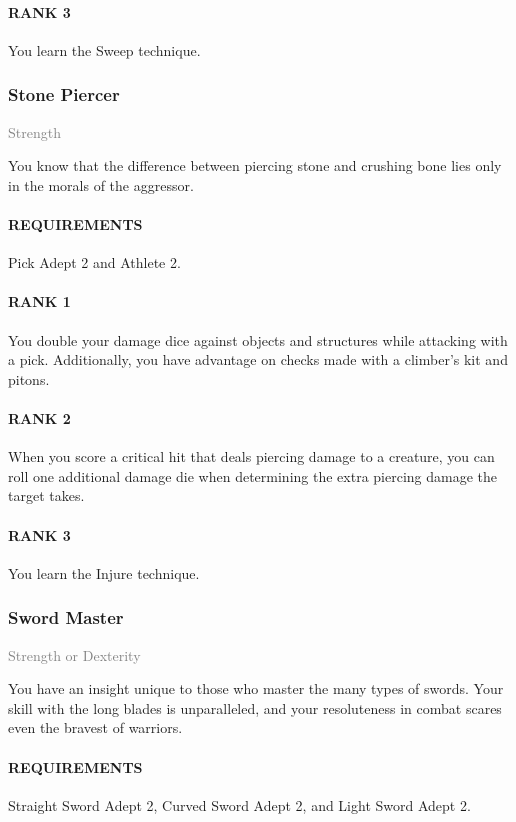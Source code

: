 \paragraph{RANK 3} You learn the Sweep technique.

\subsubsection{Stone Piercer} \label{feat::stonepiercer}
\small{\textcolor{gray}{Strength}}

\normalsize
You know that the difference between piercing stone and crushing bone lies only in the morals of the aggressor.
\paragraph{REQUIREMENTS} Pick Adept 2 and Athlete 2.
\paragraph{RANK 1} You double your damage dice against objects and structures while attacking with a pick.
Additionally, you have advantage on checks made with a climber's kit and pitons.
\paragraph{RANK 2} When you score a critical hit that deals piercing damage to a creature, you can roll one additional damage die when determining the extra piercing damage the target takes.
\paragraph{RANK 3} You learn the Injure technique.

\subsubsection{Sword Master} \label{feat::swordmaster}
\small{\textcolor{gray}{Strength or Dexterity}}

\normalsize
You have an insight unique to those who master the many types of swords.
Your skill with the long blades is unparalleled, and your resoluteness in combat scares even the bravest of warriors.
\paragraph{REQUIREMENTS} Straight Sword Adept 2, Curved Sword Adept 2, and Light Sword Adept 2.
